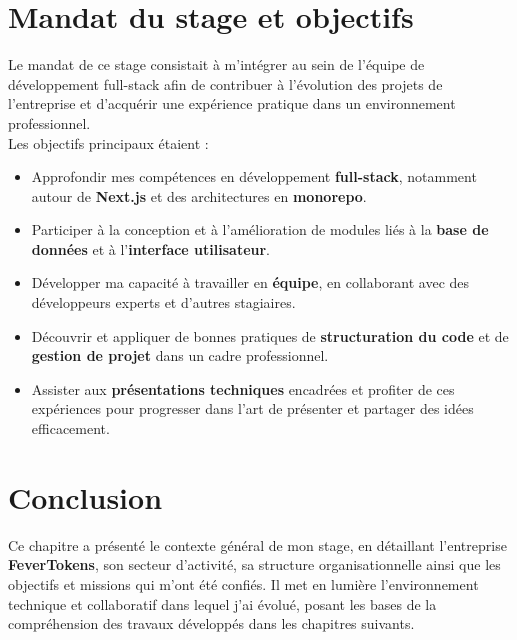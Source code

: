 
\section{Mandat du stage et objectifs}
\vskip1mm
Le mandat de ce stage consistait à m'intégrer au sein de l'équipe de développement full-stack afin de contribuer à l'évolution des projets de l'entreprise et d'acquérir une expérience pratique dans un environnement professionnel.\\[5mm]
Les objectifs principaux étaient :
\begin{itemize}
  \leftskip.75cm
    \item Approfondir mes compétences en développement \textbf{full-stack}, notamment autour de \textbf{Next.js} et des architectures en \textbf{monorepo}.
    \item Participer à la conception et à l'amélioration de modules liés à la \textbf{base de données} et à l'\textbf{interface utilisateur}.
    \item Développer ma capacité à travailler en \textbf{équipe}, en collaborant avec des développeurs experts et d'autres stagiaires.
    \item Découvrir et appliquer de bonnes pratiques de \textbf{structuration du code} et de \textbf{gestion de projet} dans un cadre professionnel.
    \item Assister aux \textbf{présentations techniques} encadrées et profiter de ces expériences pour progresser dans l'art de présenter et partager des idées efficacement.
\end{itemize}
\clearpage

\section{Conclusion}
Ce chapitre a présenté le contexte général de mon stage, en détaillant l'entreprise \textbf{\textcolor{ftRed}{FeverTokens}}, son secteur d'activité, sa structure organisationnelle ainsi que les objectifs et missions qui m'ont été confiés. Il met en lumière l'environnement technique et collaboratif dans lequel j'ai évolué, posant les bases de la compréhension des travaux développés dans les chapitres suivants.
\clearpage